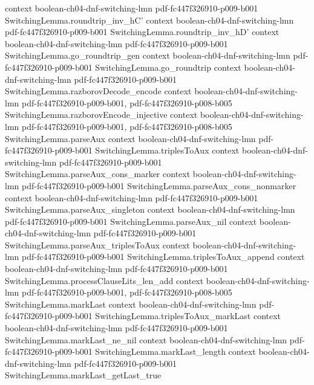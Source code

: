 \begin{theorem}
  {context}
  {boolean-ch04-dnf-switching-lmn}
  {pdf-fc447f326910-p009-b001}
\proofstep
  {SwitchingLemma.roundtrip_inv_hC'}
  {context}
  {boolean-ch04-dnf-switching-lmn}
  {pdf-fc447f326910-p009-b001}
\proofstep
  {SwitchingLemma.roundtrip_inv_hD'}
  {context}
  {boolean-ch04-dnf-switching-lmn}
  {pdf-fc447f326910-p009-b001}
\proofstep
  {SwitchingLemma.go_roundtrip_gen}
  {context}
  {boolean-ch04-dnf-switching-lmn}
  {pdf-fc447f326910-p009-b001}
\proofstep
  {SwitchingLemma.go_roundtrip}
  {context}
  {boolean-ch04-dnf-switching-lmn}
  {pdf-fc447f326910-p009-b001}
\proofstep
  {SwitchingLemma.razborovDecode_encode}
  {context}
  {boolean-ch04-dnf-switching-lmn}
  {pdf-fc447f326910-p009-b001,
    pdf-fc447f326910-p008-b005}
\proofstep
  {SwitchingLemma.razborovEncode_injective}
  {context}
  {boolean-ch04-dnf-switching-lmn}
  {pdf-fc447f326910-p009-b001,
    pdf-fc447f326910-p008-b005}
\proofstep
  {SwitchingLemma.parseAux}
  {context}
  {boolean-ch04-dnf-switching-lmn}
  {pdf-fc447f326910-p009-b001}
\proofstep
  {SwitchingLemma.triplesToAux}
  {context}
  {boolean-ch04-dnf-switching-lmn}
  {pdf-fc447f326910-p009-b001}
\proofstep
  {SwitchingLemma.parseAux_cons_marker}
  {context}
  {boolean-ch04-dnf-switching-lmn}
  {pdf-fc447f326910-p009-b001}
\proofstep
  {SwitchingLemma.parseAux_cons_nonmarker}
  {context}
  {boolean-ch04-dnf-switching-lmn}
  {pdf-fc447f326910-p009-b001}
\proofstep
  {SwitchingLemma.parseAux_singleton}
  {context}
  {boolean-ch04-dnf-switching-lmn}
  {pdf-fc447f326910-p009-b001}
\proofstep
  {SwitchingLemma.parseAux_nil}
  {context}
  {boolean-ch04-dnf-switching-lmn}
  {pdf-fc447f326910-p009-b001}
\proofstep
  {SwitchingLemma.parseAux_triplesToAux}
  {context}
  {boolean-ch04-dnf-switching-lmn}
  {pdf-fc447f326910-p009-b001}
\proofstep
  {SwitchingLemma.triplesToAux_append}
  {context}
  {boolean-ch04-dnf-switching-lmn}
  {pdf-fc447f326910-p009-b001}
\proofstep
  {SwitchingLemma.processClauseLits_len_add}
  {context}
  {boolean-ch04-dnf-switching-lmn}
  {pdf-fc447f326910-p009-b001,
    pdf-fc447f326910-p008-b005}
\proofstep
  {SwitchingLemma.markLast}
  {context}
  {boolean-ch04-dnf-switching-lmn}
  {pdf-fc447f326910-p009-b001}
\proofstep
  {SwitchingLemma.triplesToAux_markLast}
  {context}
  {boolean-ch04-dnf-switching-lmn}
  {pdf-fc447f326910-p009-b001}
\proofstep
  {SwitchingLemma.markLast_ne_nil}
  {context}
  {boolean-ch04-dnf-switching-lmn}
  {pdf-fc447f326910-p009-b001}
\proofstep
  {SwitchingLemma.markLast_length}
  {context}
  {boolean-ch04-dnf-switching-lmn}
  {pdf-fc447f326910-p009-b001}
\proofstep
  {SwitchingLemma.markLast_getLast_true}

\end{theorem}
